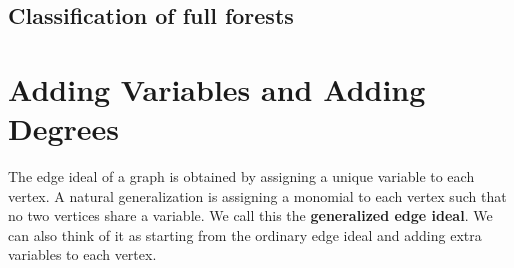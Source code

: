 \documentclass[dvipsnames,10pt]{article}
\begin{document}
\subsection{Classification of full forests}



\section{Adding Variables and Adding Degrees}

The edge ideal of a graph is obtained by assigning a unique variable to each vertex. A natural generalization is assigning a monomial to each vertex such that no two vertices share a variable. We call this the \textbf{generalized edge ideal}. We can also think of it as starting from the ordinary edge ideal and adding extra variables to each vertex. 
\vspace{20pt}
\end{document}
